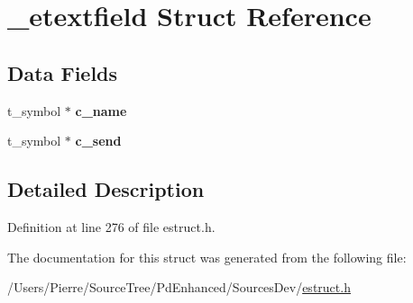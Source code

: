 \hypertarget{struct__etextfield}{\section{\-\_\-etextfield Struct Reference}
\label{struct__etextfield}
}
\subsection*{Data Fields}
\begin{DoxyCompactItemize}
\item 
\hypertarget{struct__etextfield_a6b1d595c3eed41231261cc949de6c059}{t\-\_\-symbol $\ast$ {\bfseries c\-\_\-name}}\label{struct__etextfield_a6b1d595c3eed41231261cc949de6c059}

\item 
\hypertarget{struct__etextfield_a8b8515ab22b24ef7b726fc06af1254fe}{t\-\_\-symbol $\ast$ {\bfseries c\-\_\-send}}\label{struct__etextfield_a8b8515ab22b24ef7b726fc06af1254fe}

\end{DoxyCompactItemize}


\subsection{Detailed Description}


Definition at line 276 of file estruct.\-h.



The documentation for this struct was generated from the following file\-:\begin{DoxyCompactItemize}
\item 
/\-Users/\-Pierre/\-Source\-Tree/\-Pd\-Enhanced/\-Sources\-Dev/\hyperlink{estruct_8h}{estruct.\-h}\end{DoxyCompactItemize}
